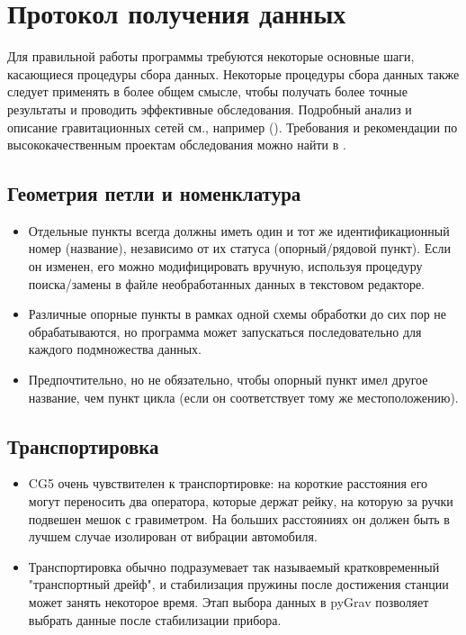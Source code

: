 \chapter[Протокол получения данных]{Протокол получения данных}
\label{chap:acquisition_protocol}

Для правильной работы программы требуются некоторые основные шаги, касающиеся
процедуры сбора данных. Некоторые процедуры сбора данных также следует применять
в более общем смысле, чтобы получать более точные результаты и проводить
эффективные обследования. Подробный анализ и описание гравитационных сетей см.,
например (\cite{lambert_nano_1977, torge_1980}). Требования и рекомендации по
высококачественным проектам обследования можно найти в \cite{seigel_1995}.

\section[Геометрия петли и номенклатура]{Геометрия петли и номенклатура}
\label{sec:loop_geometries_and_nomenclature}

\begin{itemize}
    \item Отдельные пункты всегда должны иметь один и тот же идентификационный
    номер (название), независимо от их статуса (опорный/рядовой
    пункт). Если он изменен, его можно модифицировать вручную, используя процедуру
    поиска/замены в файле необработанных данных в текстовом редакторе.
    
    \item Различные опорные пункты в рамках одной схемы обработки до сих пор не
    обрабатываются, но программа может запускаться последовательно для каждого
    подмножества данных.
    
    \item Предпочтительно, но не обязательно, чтобы опорный пункт имел другое
    название, чем пункт цикла (если он соответствует тому же местоположению).
    
\end{itemize}

\section[Транспортировка]{Транспортировка}
\label{sec:transportation}

\begin{itemize}
    \item CG5 очень чувствителен к транспортировке: на короткие расстояния его
    могут переносить два оператора, которые держат рейку, на которую за ручки
    подвешен мешок с гравиметром. На больших расстояниях он должен быть в лучшем
    случае изолирован от вибрации автомобиля.

    \item Транспортировка обычно подразумевает так называемый кратковременный
    "транспортный дрейф", и стабилизация пружины после достижения станции может
    занять некоторое время. Этап выбора данных в pyGrav позволяет выбрать данные
    после стабилизации прибора.

\end{itemize}

